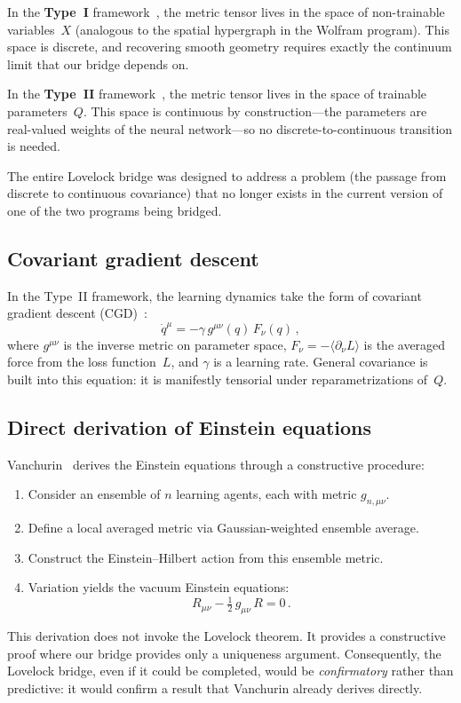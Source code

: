 \documentclass[11pt]{article}
\theoremstyle{definition}
\theoremstyle{remark}
\begin{document}
In the \textbf{Type~I} framework~\cite{Vanchurin2020}, the metric tensor
lives in the space of non-trainable variables~$X$ (analogous to the
spatial hypergraph in the Wolfram program).
This space is discrete, and recovering smooth geometry requires exactly
the continuum limit that our bridge depends on.

In the \textbf{Type~II} framework~\cite{Vanchurin2025,Vanchurin2025CGD},
the metric tensor lives in the space of trainable parameters~$Q$.
This space is continuous by construction---the parameters are
real-valued weights of the neural network---so no discrete-to-continuous
transition is needed.

The entire Lovelock bridge was designed to address a problem (the
passage from discrete to continuous covariance) that no longer exists in
the current version of one of the two programs being bridged.

\subsection{Covariant gradient descent}
\label{sec:CGD}

In the Type~II framework, the learning dynamics take the form of
covariant gradient descent (CGD)~\cite{Vanchurin2025CGD}:
\begin{equation}
\label{eq:CGD}
\dot{q}^\mu = -\gamma\, g^{\mu\nu}(q)\, F_\nu(q)\,,
\end{equation}
where $g^{\mu\nu}$ is the inverse metric on parameter space, $F_\nu =
-\langle \partial_\nu L \rangle$ is the averaged force from the loss
function~$L$, and $\gamma$ is a learning rate.
General covariance is built into this equation: it is manifestly tensorial
under reparametrizations of~$Q$.

\subsection{Direct derivation of Einstein equations}
\label{sec:einstein-derivation}

Vanchurin~\cite{Vanchurin2025} derives the Einstein equations through a
constructive procedure:
\begin{enumerate}
\item Consider an ensemble of $n$ learning agents, each with metric
  $g_{n,\mu\nu}$.
\item Define a local averaged metric via Gaussian-weighted ensemble
  average.
\item Construct the Einstein--Hilbert action from this ensemble metric.
\item Variation yields the vacuum Einstein equations:
  \begin{equation}
  \label{eq:einstein-vacuum}
  R_{\mu\nu} - \tfrac{1}{2}\, g_{\mu\nu}\, R = 0\,.
  \end{equation}
\end{enumerate}
This derivation does not invoke the Lovelock theorem.
It provides a constructive proof where our bridge provides only a
uniqueness argument.
Consequently, the Lovelock bridge, even if it could be completed, would
be \emph{confirmatory} rather than predictive: it would confirm a result
that Vanchurin already derives directly.
\end{document}
